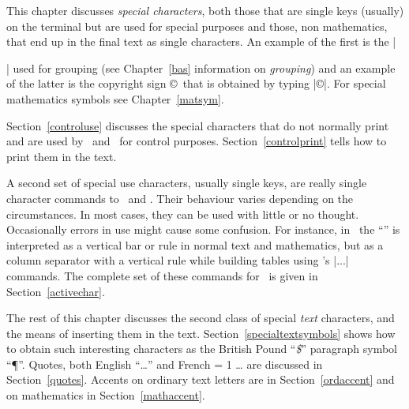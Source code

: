   \relax \fi %

\def\cqu{\cquote{The life is so short, the craft so long to learn.}{Aphorisms,
Hippocrates (460-400~BC)}
}


This chapter discusses {\it special characters}, both those that are single
keys (usually) on the terminal but are used for special purposes
and those, non mathematics,  that end up in the final text as
single characters. An example of the first is the |{| used for grouping (see
Chapter~\ref{bas} information on {\it grouping}) and an example of the latter is the copyright sign
\copyright\ that is obtained by typing |\copyright|. For special mathematics
symbols see Chapter~\ref{matsym}. 

Section~\ref{controluse} discusses the special characters that do not
normally print and are used by \tex\ and \intex\ for control purposes.
Section~\ref{controlprint} tells how to print them in the text.

A second set of special use characters, usually single keys, 
are really single character commands to \tex\
and \intex. Their behaviour varies depending on the circumstances. In most
cases, they can be used with little or no thought. Occasionally errors in use
might cause some confusion. For instance, in \intex\ the ``\vrt'' is
interpreted as a vertical bar or rule in normal text and mathematics, but as a
column separator with a vertical rule while building tables using \intex's
|\begintable...\endtable| commands. The complete set of these commands for
\intex\ is given in Section~\ref{activechar}.


The rest of this chapter discusses the second class of special {\it text}
characters, and the means of inserting them in the text.
Section~\ref{specialtextsymbols} shows how to obtain such interesting
characters as the British Pound ``{\it\$}'' paragraph symbol ``\P''. 
Quotes, both English ``\dots'' and French  
{\language = 1 \ldq\dots\rdq}  are discussed in
Section~\ref{quotes}.
Accents
on ordinary text letters are in Section~\ref{ordaccent} and on mathematics in
Section~\ref{mathaccent}. 



}
